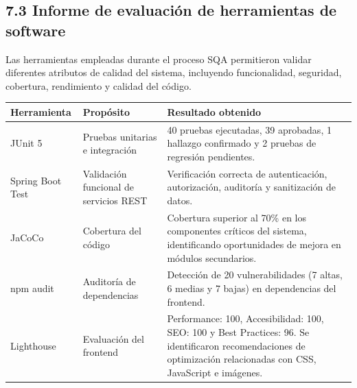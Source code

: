 \subsection{7.3 Informe de evaluación de herramientas de software}

Las herramientas empleadas durante el proceso SQA permitieron validar diferentes atributos de calidad del sistema, incluyendo funcionalidad, seguridad, cobertura, rendimiento y calidad del código.

\begin{table}[H]
    \centering
    \scriptsize
    \begin{tabular}{|p{3cm}|p{5cm}|p{6cm}|}
        \hline
        \textbf{Herramienta}                   &
        \textbf{Propósito}                     &
        \textbf{Resultado obtenido}                                                                                                                                        \\
        \hline

        JUnit 5                                &
        Pruebas unitarias e integración        &
        40 pruebas ejecutadas, 39 aprobadas, 1 hallazgo confirmado y 2 pruebas de regresión pendientes.                                                                    \\
        \hline

        Spring Boot Test                       &
        Validación funcional de servicios REST &
        Verificación correcta de autenticación, autorización, auditoría y sanitización de datos.                                                                           \\
        \hline

        JaCoCo                                 &
        Cobertura del código                   &
        Cobertura superior al 70\% en los componentes críticos del sistema, identificando oportunidades de mejora en módulos secundarios.                                  \\
        \hline

        npm audit                              &
        Auditoría de dependencias              &
        Detección de 20 vulnerabilidades (7 altas, 6 medias y 7 bajas) en dependencias del frontend.                                                                       \\
        \hline

        Lighthouse                             &
        Evaluación del frontend                &
        Performance: 100, Accesibilidad: 100, SEO: 100 y Best Practices: 96. Se identificaron recomendaciones de optimización relacionadas con CSS, JavaScript e imágenes. \\
        \hline


\end{tabular}
\end{table}
